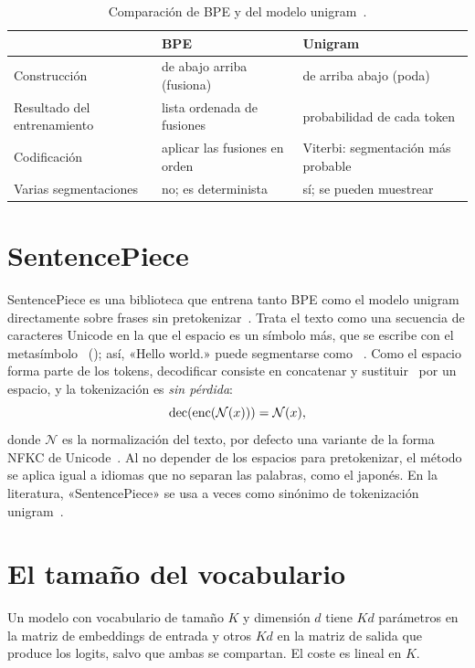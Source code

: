 \begin{table}[h]
\centering\small
\caption{Comparación de BPE y del modelo unigram~\cite[§3.4]{kudo}.}\label{tab:bpe-unigram}
\begin{tabular}{@{}lll@{}}
\toprule
 & BPE & Unigram \\
\midrule
Construcción & de abajo arriba (fusiona) & de arriba abajo (poda) \\
Resultado del entrenamiento & lista ordenada de fusiones & probabilidad de cada token \\
Codificación & aplicar las fusiones en orden & Viterbi: segmentación más probable \\
Varias segmentaciones & no; es determinista & sí; se pueden muestrear \\
\bottomrule
\end{tabular}
\end{table}

\section{SentencePiece}

SentencePiece es una biblioteca que entrena tanto BPE como el modelo unigram directamente sobre frases sin pretokenizar~\cite{sentencepiece}. Trata el texto como una secuencia de caracteres Unicode en la que el espacio es un símbolo más, que se escribe con el metasímbolo \ESP\ (); así, «Hello world.» puede segmentarse como ~\cite[§3.1]{sentencepiece}. Como el espacio forma parte de los tokens, decodificar consiste en concatenar y sustituir \ESP\ por un espacio, y la tokenización es \emph{sin pérdida}:
\[
\operatorname{dec}(\operatorname{enc}(\mathcal{N}(x)))=\mathcal{N}(x),
\]
donde $\mathcal{N}$ es la normalización del texto, por defecto una variante de la forma NFKC de Unicode~\cite[§3.4]{sentencepiece}. Al no depender de los espacios para pretokenizar, el método se aplica igual a idiomas que no separan las palabras, como el japonés. En la literatura, «SentencePiece» se usa a veces como sinónimo de tokenización unigram~\cite[§2.4.3]{jm3}.

\section{El tamaño del vocabulario}

\begin{proposicion}\label{prop:coste-vocab}
Un modelo con vocabulario de tamaño $K$ y dimensión $d$ tiene $Kd$ parámetros en la matriz de embeddings de entrada y otros $Kd$ en la matriz de salida que produce los logits, salvo que ambas se compartan. El coste es lineal en $K$.
\end{proposicion}


